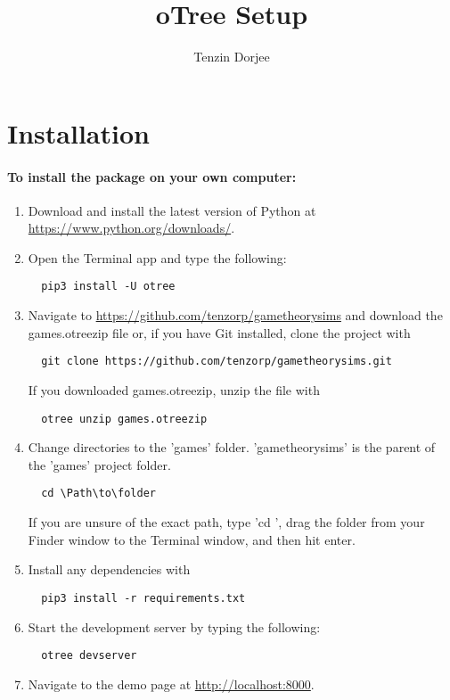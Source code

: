 \documentclass{article}
\title{oTree Setup}
\author{Tenzin Dorjee}
\begin{document}
	\maketitle
	\newpage
	\tableofcontents
	\newpage
	
	\section{Installation}
		\paragraph{To install the package on your own computer:}
			\begin{enumerate}
				\item Download and install the latest version of Python at \url{https://www.python.org/downloads/}.
				\item Open the Terminal app and type the following:
					\begin{lstlisting}
  pip3 install -U otree
					\end{lstlisting}
				\item Navigate to \url{https://github.com/tenzorp/gametheorysims} and download the games.otreezip file or, if you have Git installed, clone the project with 
					\begin{lstlisting}
  git clone https://github.com/tenzorp/gametheorysims.git
					\end{lstlisting}
					If you downloaded games.otreezip, unzip the file with
					\begin{lstlisting}
  otree unzip games.otreezip
					\end{lstlisting}
				\item Change directories to the 'games' folder. 'gametheorysims' is the parent of the 'games' project folder.
					\begin{lstlisting}
  cd \Path\to\folder
					\end{lstlisting}
					If you are unsure of the exact path, type 'cd ', drag the folder from your Finder window to the Terminal window, and then hit enter.
				\item Install any dependencies with
					\begin{lstlisting}
  pip3 install -r requirements.txt
					\end{lstlisting}
				\item Start the development server by typing the following:
				\begin{lstlisting}
  otree devserver
				\end{lstlisting}
				\item Navigate to the demo page at \url{http://localhost:8000}.
  			\end{enumerate}
  		
\end{document}
